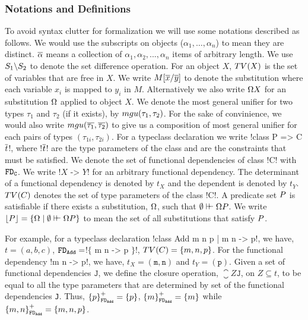 \documentclass[format=sigplan,manuscript,review,screen,nonacm,margin=1in]{acmart}
\begin{document}
\subsubsection {Notations and Definitions}\label{subsubsec:fd-notations}
To avoid syntax clutter for formalization we will use some notations described as follows.
We would use the subscripts on objects ($\alpha_1,\ldots, \alpha_n$) to mean they are distinct.
$\overline{\alpha}$ means a collection of $\alpha_1, \alpha_2, ..., \alpha_n$ items of arbitrary length.
We use $S_1 \backslash S_2$ to denote the set difference operation. For an object $X$,
$TV(X)$ is the set of variables that are free in $X$.
We write $M[\overline{x}/\overline{y}]$ to denote the substitution where each variable
$x_i$ is mapped to $y_i$ in $M$. Alternatively we also
write $\Omega X$ for an substitution $\Omega$ applied to object $X$.
We denote the most general unifier for two types $\tau_1$ and $\tau_2$ (if it exists),
by $mgu(\tau_1,\tau_2)$\cite{robinson_machine-oriented_1965}. For the sake of convinience,
we would also write $mgu(\overline{\tau_1},\overline{\tau_2})$ to give us a composition of most general
unifier for each pairs of types $(\tau_{1i}, \tau_{2i})$.
For a typeclass declaration we write !class P => C $\overline{t}$!, where !$\overline{t}$! are the type parameters
of the class and \Preds{} are the constraints that must be satisfied.
We denote the set of functional dependencies of class !C! with $\texttt{FD}_\texttt{C}$.
We write !$X$ -> $Y$! for an arbitrary functional dependency.
The determinant of a functional dependency is denoted by $t_{X}$
and the dependent is denoted by  $t_{Y}$. $TV(C)$ denotes the set of type parameters
of the class !C!. A predicate set $P$ is satisfiable if there exists a substitution,
$\Omega$, such that $\emptyset\vdash\hspace{-0.7ex}\vdash \Omega P$.
We write $\lfloor P\rfloor = \{\Omega \mid \emptyset \vdash\hspace{-0.7ex}\vdash \Omega P\}$
to mean the set of all substitutions that satisfy $P$.

For example, for a typeclass declaration !class Add m n p | m n -> p!,
we have, $t = (a, b, c)$, $\texttt{FD}_\texttt{Add}=$!$\{$ m n -> p $\}$!, $TV(C) = \{m, n, p\}$.
For the functional dependency !m n -> p!, we have, $t_X = {(\texttt{m},\texttt{n})}$ and $t_Y = {(\texttt{p})}$.
Given a set of functional dependencies $\texttt{J}$, we define the closure operation,
$\closure Z {\texttt{J}}$, on $Z \subseteq t$, to be equal to all the type parameters
that are determined by set of the functional dependencies \texttt{J}.
Thus, ${\{p\}}^{+}_{\texttt{FD}_\texttt{Add}} = \{p\}$,
${\{m\}}^{+}_{\texttt{FD}_\texttt{Add}} = \{m\}$ while ${\{m, n\}}^{+}_{\texttt{FD}_\texttt{Add}} = \{m, n, p\}$.
\end{document}
